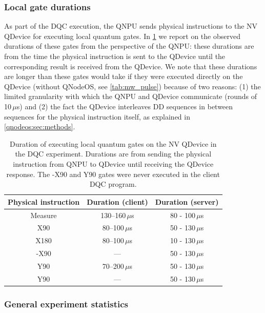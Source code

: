 \subsubsection{Local gate durations}

As part of the \ac{DQC} execution, the \ac{QNPU} sends physical instructions to the \ac{NV} \ac{QDevice} for executing local quantum gates. In \cref{tab:gate_durations} we report on the observed durations of these gates from the perspective of the \ac{QNPU}: these durations are from the time the physical instruction is sent to the \ac{QDevice} until the corresponding result is received from the \ac{QDevice}. We note that these durations are longer than these gates would take if they were executed directly on the \ac{QDevice} (without \ac{QNodeOS}, see \cref{tab:mw_pulse}) because of two reasons: (1) the limited granularity with which the \ac{QNPU} and \ac{QDevice} communicate (rounds of 10\,$\mu$s) and (2) the fact the \ac{QDevice} interleaves \ac{DD} sequences in between sequences for the physical instruction itself, as explained in \cref{qnodeos:sec:methods}.

\begin{table}
    \centering
    \begin{tabular}{|c|c|c|}
    \hline
    \textbf{Physical instruction} & \textbf{Duration (client)} & \textbf{Duration (server)} \\ 
    \hline
    Measure & 130--160\,$\mu$s & 80 - 100\,$\mu$s \\
    X90 & 80--100\,$\mu$s & 50 - 130\,$\mu$s \\
    X180 & 80--100\,$\mu$s & 10 - 130\,$\mu$s \\
    -X90 & --- & 50 - 130\,$\mu$s \\
    Y90 & 70--200\,$\mu$s & 50 - 130\,$\mu$s \\
    Y90 & --- & 50 - 130\,$\mu$s \\
    \hline
    \end{tabular}
    \caption{Duration of executing local quantum gates on the \ac{NV} \ac{QDevice} in the \ac{DQC} experiment. Durations are from sending the physical instruction from \ac{QNPU} to \ac{QDevice} until receiving the \ac{QDevice} response. The -X90 and Y90 gates were never executed in the client \ac{DQC} program.}
    \label{tab:gate_durations}
\end{table}

\subsubsection{General experiment statistics}

